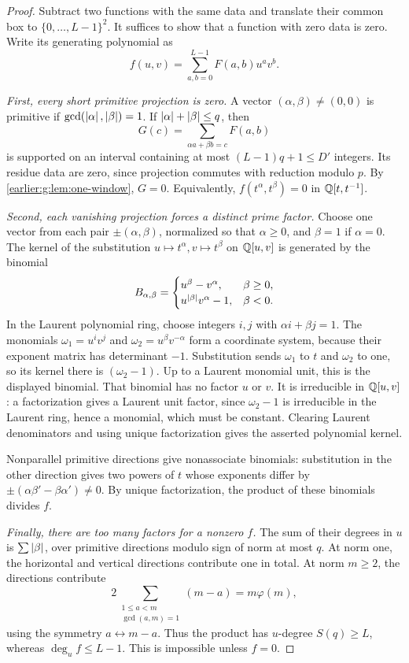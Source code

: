 \begin{proof}
Subtract two functions with the same data and translate their common
box to \(\{0,\ldots,L-1\}^2\). It suffices to show that a function
with zero data is zero. Write its generating polynomial as
\[
 f(u,v)=\sum_{a,b=0}^{L-1}F(a,b)u^av^b.
\]

\emph{First, every short primitive projection is zero.}
A vector \((\alpha,\beta)\ne(0,0)\) is primitive if
\(\gcd(\left|\alpha\right|,\left|\beta\right|)=1\). If
\(\left|\alpha\right|+\left|\beta\right|\le q\), then
\[
 G(c)=\sum_{\alpha a+\beta b=c}F(a,b)
\]
is supported on an interval containing at most
\((L-1)q+1\le D'\) integers. Its residue data are zero, since
projection commutes with reduction modulo \(p\). By
\cref{earlier:g:lem:one-window}, \(G=0\). Equivalently,
\(f(t^\alpha,t^\beta)=0\) in \(\mathbb Q[t,t^{-1}]\).

\emph{Second, each vanishing projection forces a distinct prime factor.}
Choose one vector from each pair \(\pm(\alpha,\beta)\), normalized so
that \(\alpha\ge0\), and \(\beta=1\) if \(\alpha=0\).
The kernel of the substitution \(u\mapsto t^\alpha,v\mapsto t^\beta\)
on \(\mathbb Q[u,v]\) is generated by the binomial
\[
 B_{\alpha,\beta}=
 \begin{cases}
 u^\beta-v^\alpha,&\beta\ge0,\\
 u^{\left|\beta\right|}v^\alpha-1,&\beta<0.
 \end{cases}
\]
In the Laurent polynomial ring,
choose integers \(i,j\) with \(\alpha i+\beta j=1\).
The monomials \(\omega_1=u^iv^j\) and \(\omega_2=u^\beta v^{-\alpha}\)
form a coordinate system, because their exponent matrix has
determinant \(-1\). Substitution sends \(\omega_1\) to \(t\) and
\(\omega_2\) to one, so its kernel there is \((\omega_2-1)\). Up to a Laurent monomial unit, this is
the displayed binomial. That binomial has no factor \(u\) or \(v\).
It is irreducible in \(\mathbb Q[u,v]\): a factorization gives a Laurent
unit factor, since \(\omega_2-1\) is irreducible in the Laurent ring,
hence a monomial, which must be constant.
Clearing Laurent denominators and using unique factorization gives
the asserted polynomial kernel.

Nonparallel primitive directions give nonassociate binomials:
substitution in the other direction gives two powers of \(t\)
whose exponents differ by \(\pm(\alpha\beta'-\beta\alpha')\ne0\).
By unique factorization, the product of these binomials divides \(f\).

\emph{Finally, there are too many factors for a nonzero \(f\).}
The sum of their degrees in \(u\) is
\(\sum\left|\beta\right|\), over primitive directions modulo sign of norm
at most \(q\). At norm one, the horizontal and vertical directions
contribute one in total. At norm \(m\ge2\), the directions contribute
\[
 2\sum_{\substack{1\le a<m\\\gcd(a,m)=1}}(m-a)
 =m\varphi(m),
\]
using the symmetry \(a\leftrightarrow m-a\). Thus the product has
\(u\)-degree \(S(q)\ge L\), whereas \(\deg_uf\le L-1\).
This is impossible unless \(f=0\).
\end{proof}

